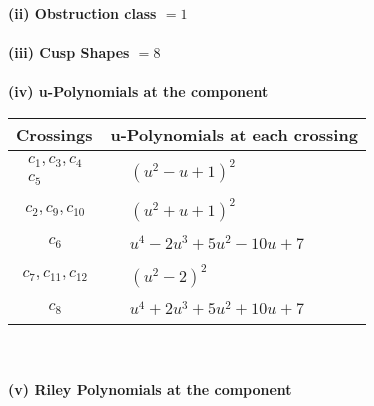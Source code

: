 \documentclass[1p]{elsarticle_modified}
\theoremstyle{definition}
\begin{document}
\flushleft \textbf{(ii) Obstruction class $= 1$}\\~\\
\flushleft \textbf{(iii) Cusp Shapes $= 8$}\\~\\
\newpage\renewcommand{\arraystretch}{1}
\flushleft \textbf{(iv) u-Polynomials at the component}\newline \\
\begin{tabular}{m{50pt}|m{274pt}}
Crossings & \hspace{64pt}u-Polynomials at each crossing \\
\hline $$\begin{aligned}c_{1},c_{3},c_{4}\\c_{5}\end{aligned}$$&$\begin{aligned}
&(u^2- u+1)^2
\end{aligned}$\\
\hline $$\begin{aligned}c_{2},c_{9},c_{10}\end{aligned}$$&$\begin{aligned}
&(u^2+u+1)^2
\end{aligned}$\\
\hline $$\begin{aligned}c_{6}\end{aligned}$$&$\begin{aligned}
&u^4-2 u^3+5 u^2-10 u+7
\end{aligned}$\\
\hline $$\begin{aligned}c_{7},c_{11},c_{12}\end{aligned}$$&$\begin{aligned}
&(u^2-2)^2
\end{aligned}$\\
\hline $$\begin{aligned}c_{8}\end{aligned}$$&$\begin{aligned}
&u^4+2 u^3+5 u^2+10 u+7
\end{aligned}$\\
\hline
\end{tabular}\\~\\
\newpage\renewcommand{\arraystretch}{1}
\flushleft \textbf{(v) Riley Polynomials at the component}\newline \\
\end{document}
